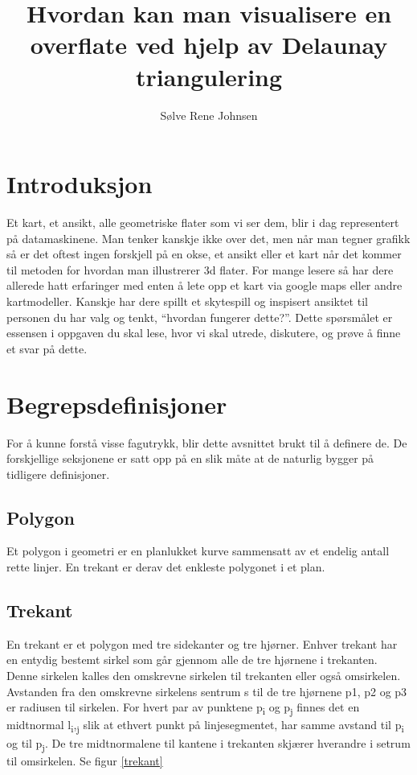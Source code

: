 \documentclass[norsk]{article}
\title{Hvordan kan man visualisere en overflate ved hjelp av Delaunay triangulering}
\author{Sølve Rene Johnsen}
\def\SB#1{\textsubscript{#1}}
\begin{document}
\maketitle{}
\section*{Introduksjon}
Et kart, et ansikt, alle geometriske flater som vi ser dem, blir i dag
representert på datamaskinene. Man tenker kanskje ikke
over det, men når man tegner grafikk så er det oftest ingen forskjell
på en okse, et ansikt eller et kart når det kommer til metoden for hvordan man
illustrerer 3d flater. For mange lesere så har dere
allerede hatt erfaringer med enten å lete opp et kart via google maps
eller andre kartmodeller. Kanskje har dere spillt et skytespill og
inspisert ansiktet til personen du har valg og tenkt, ``hvordan
fungerer dette?''. Dette spørsmålet er essensen i oppgaven du skal
lese, hvor vi skal utrede, diskutere, og prøve å finne et svar på
dette.

\section{Begrepsdefinisjoner}
For å kunne forstå visse fagutrykk, blir dette avsnittet brukt til å 
definere de.
De forskjellige seksjonene er satt opp på en slik måte at de naturlig bygger
på tidligere definisjoner.

\subsection{Polygon}
Et polygon i geometri er en planlukket kurve sammensatt av et endelig
antall rette linjer. En trekant er derav det enkleste polygonet i et
plan.

\subsection{Trekant}
En trekant er et polygon med tre sidekanter og tre hjørner. Enhver
trekant har en entydig bestemt sirkel som går gjennom alle de tre
hjørnene i trekanten. Denne sirkelen kalles den omskrevne sirkelen til
trekanten eller også omsirkelen.  Avstanden fra den omskrevne
sirkelens sentrum s til de tre hjørnene p1, p2 og p3 er radiusen
til sirkelen. For hvert par av punktene p\SB{i} og p\SB{j} finnes det
en midtnormal l\SB{i},\SB{j} slik at ethvert punkt på
linjesegmentet, har samme avstand til p\SB{i} og til p\SB{j}. De tre
midtnormalene til kantene i trekanten skjærer hverandre i setrum til omsirkelen.
Se figur
\ref{trekant}
\end{document}
